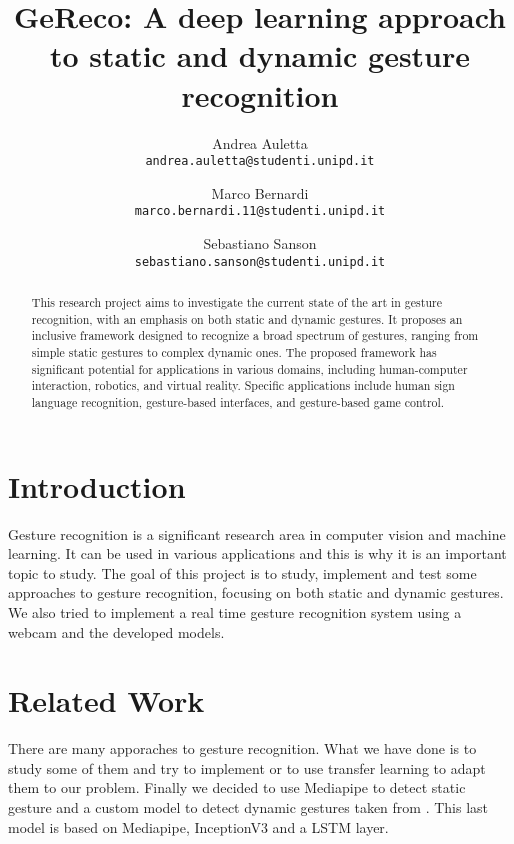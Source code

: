 \documentclass[10pt,twocolumn,letterpaper]{article}
\begin{document}
\title{GeReco: A deep learning approach to static and dynamic gesture recognition}

\author{Andrea Auletta\\
{\tt\small andrea.auletta@studenti.unipd.it}
\and
Marco Bernardi\\
{\tt\small marco.bernardi.11@studenti.unipd.it}
\and
Sebastiano Sanson\\
{\tt\small sebastiano.sanson@studenti.unipd.it}
}

\maketitle

\begin{abstract}
   This research project aims to investigate the current state of the art in gesture recognition, with an emphasis on both static and dynamic gestures. 
   It proposes an inclusive framework designed to recognize a broad spectrum of gestures, ranging from simple static gestures to complex dynamic ones. 
   The proposed framework has significant potential for applications in various domains, including human-computer interaction, robotics, and virtual reality. 
   Specific applications include human sign language recognition, gesture-based interfaces, and gesture-based game control.
\end{abstract}


\section{Introduction}
Gesture recognition is a significant research area in computer vision and machine learning. It can be used in various applications and this is why it is an important topic to study.
The goal of this project is to study, implement and test some approaches to gesture recognition, focusing on both static and dynamic gestures. We also tried 
to implement a real time gesture recognition system using a webcam and the developed models.
\section{Related Work}
There are many apporaches to gesture recognition. What we have done is to study some of them and try to implement or to use transfer learning to adapt them to our problem.
Finally we decided to use Mediapipe \cite{lugaresi2019mediapipeframeworkbuildingperception} \cite{zhang2020mediapipehandsondevicerealtime} to detect static gesture and 
a custom model to detect dynamic gestures taken from \cite{electronics13163233}. This last model is based on Mediapipe, InceptionV3 and a LSTM layer.
\end{document}
